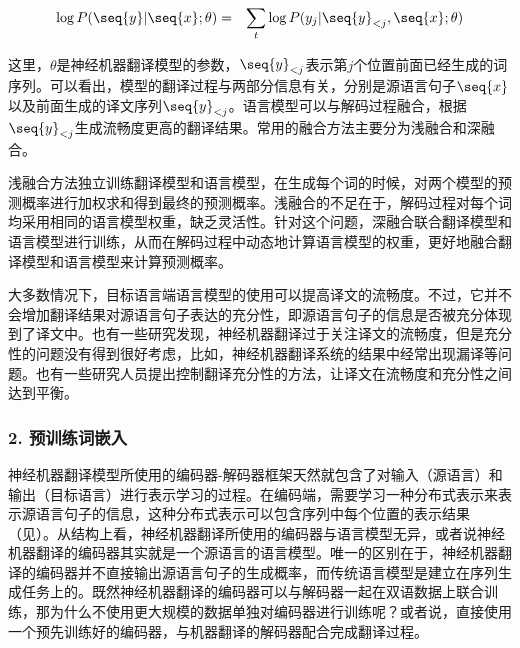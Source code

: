 \begin{eqnarray}
\log{P(\seq{y} | \seq{x}; \theta)} & = & \sum_{t}{\log{P(y_j | {\seq{y}}_{<j}, \seq{x}; \theta)}}
\label{eq:16-1}
\end{eqnarray}

\noindent 这里，$\theta$是神经机器翻译模型的参数，${\seq{y}}_{<j}$表示第$j$个位置前面已经生成的词序列。可以看出，模型的翻译过程与两部分信息有关，分别是源语言句子$\seq{x}$以及前面生成的译文序列${\seq{y}}_{<j}$。语言模型可以与解码过程融合，根据${\seq{y}}_{<j}$生成流畅度更高的翻译结果。常用的融合方法主要分为浅融合和深融合。

\parinterval 浅融合方法独立训练翻译模型和语言模型，在生成每个词的时候，对两个模型的预测概率进行加权求和得到最终的预测概率。浅融合的不足在于，解码过程对每个词均采用相同的语言模型权重，缺乏灵活性。针对这个问题，深融合联合翻译模型和语言模型进行训练，从而在解码过程中动态地计算语言模型的权重，更好地融合翻译模型和语言模型来计算预测概率。

\parinterval 大多数情况下，目标语言端语言模型的使用可以提高译文的流畅度。不过，它并不会增加翻译结果对源语言句子表达的充分性，即源语言句子的信息是否被充分体现到了译文中。也有一些研究发现，神经机器翻译过于关注译文的流畅度，但是充分性的问题没有得到很好考虑，比如，神经机器翻译系统的结果中经常出现漏译等问题。也有一些研究人员提出控制翻译充分性的方法，让译文在流畅度和充分性之间达到平衡。

\subsubsection{2. 预训练词嵌入}

\parinterval 神经机器翻译模型所使用的编码器-解码器框架天然就包含了对输入（源语言）和输出（目标语言）进行表示学习的过程。在编码端，需要学习一种分布式表示来表示源语言句子的信息，这种分布式表示可以包含序列中每个位置的表示结果（见{\chapternine}）。从结构上看，神经机器翻译所使用的编码器与语言模型无异，或者说神经机器翻译的编码器其实就是一个源语言的语言模型。唯一的区别在于，神经机器翻译的编码器并不直接输出源语言句子的生成概率，而传统语言模型是建立在序列生成任务上的。既然神经机器翻译的编码器可以与解码器一起在双语数据上联合训练，那为什么不使用更大规模的数据单独对编码器进行训练呢？或者说，直接使用一个预先训练好的编码器，与机器翻译的解码器配合完成翻译过程。

